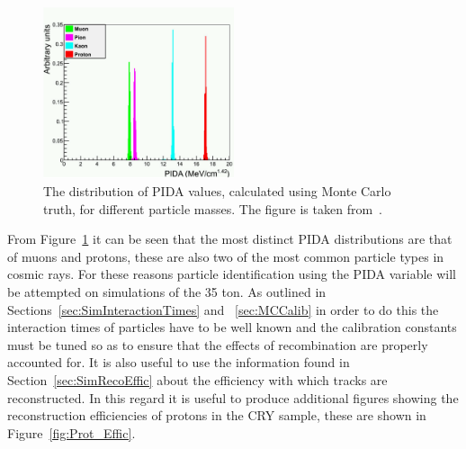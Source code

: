 \begin{figure}[h!]
  \centering
  \includegraphics[width=0.5\textwidth]{TruthPIDA}
  \caption[The distribution of PIDA values, calculated using Monte Carlo truth, for different particle masses]
          {The distribution of PIDA values, calculated using Monte Carlo truth, for different particle masses. The figure is taken from~\citep{PIDA_Paper}.}
  \label{fig:PIDA_MC}
\end{figure}

From Figure~\ref{fig:PIDA_MC} it can be seen that the most distinct PIDA distributions are that of muons and protons, these are also two of the most common particle types in cosmic rays. For these reasons particle identification using the PIDA variable will be attempted on simulations of the 35 ton. As outlined in Sections~\ref{sec:SimInteractionTimes} and ~\ref{sec:MCCalib} in order to do this the interaction times of particles have to be well known and the calibration constants must be tuned so as to ensure that the effects of recombination are properly accounted for. It is also useful to use the information found in Section~\ref{sec:SimRecoEffic} about the efficiency with which tracks are reconstructed. In this regard it is useful to produce additional figures showing the reconstruction efficiencies of protons in the CRY sample, these are shown in Figure~\ref{fig:Prot_Effic}.\\

